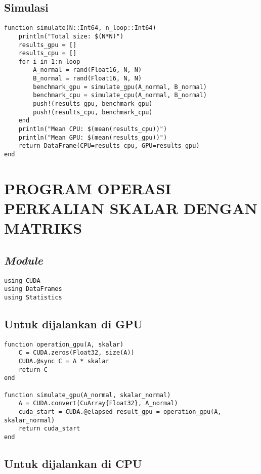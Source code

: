 \section{Simulasi}

\begin{lstlisting}
function simulate(N::Int64, n_loop::Int64)
    println("Total size: $(N*N)")
    results_gpu = []
    results_cpu = []
    for i in 1:n_loop
        A_normal = rand(Float16, N, N)
        B_normal = rand(Float16, N, N)
        benchmark_gpu = simulate_gpu(A_normal, B_normal)
        benchmark_cpu = simulate_cpu(A_normal, B_normal)
        push!(results_gpu, benchmark_gpu)
        push!(results_cpu, benchmark_cpu)
    end
    println("Mean CPU: $(mean(results_cpu))")
    println("Mean GPU: $(mean(results_gpu))")
    return DataFrame(CPU=results_cpu, GPU=results_gpu)
end
\end{lstlisting}

\chapter{PROGRAM OPERASI PERKALIAN SKALAR DENGAN MATRIKS}
\label{appx:multiplication_scalar_matrix}

\section{\emph{Module}}

\begin{lstlisting}
using CUDA
using DataFrames
using Statistics
\end{lstlisting}

\section{Untuk dijalankan di GPU}

\begin{lstlisting}
function operation_gpu(A, skalar)
    C = CUDA.zeros(Float32, size(A))
    CUDA.@sync C = A * skalar
    return C
end

function simulate_gpu(A_normal, skalar_normal)
    A = CUDA.convert(CuArray{Float32}, A_normal)
    cuda_start = CUDA.@elapsed result_gpu = operation_gpu(A, skalar_normal)
    return cuda_start
end
\end{lstlisting}

\section{Untuk dijalankan di CPU}

